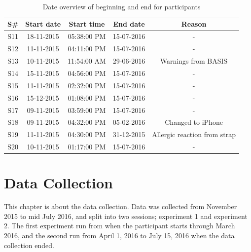 \documentclass[12pt]{article} %
\begin{document}
\begin{table}[H]
\center
\begin{footnotesize}
	\begin{tabular}{| c | c | c | c | c |}
	\hline
	\textbf{S\#} & \textbf{Start date} & \textbf{Start time} & \textbf{End date} & \textbf{Reason} \\
	
	\hline
	S11 & 18-11-2015 & 05:38:00 PM & 15-07-2016 & -\\
	S12 & 11-11-2015 & 04:11:00 PM & 15-07-2016 & -\\
	S13 & 10-11-2015 & 11:54:00 AM & 29-06-2016 & Warnings from BASIS\\
	S14 & 15-11-2015 & 04:56:00 PM & 15-07-2016 & -\\
	S15 & 11-11-2015 & 02:32:00 PM & 15-07-2016 & -\\
	S16 & 15-12-2015 & 01:08:00 PM & 15-07-2016 & -\\
	S17 & 09-11-2015 & 03:59:00 PM & 15-07-2016 & -\\
	S18 & 09-11-2015 & 04:32:00 PM & 05-02-2016 & Changed to iPhone\\
	S19 & 11-11-2015 & 04:30:00 PM & 31-12-2015 & Allergic reaction from strap\\
	S20 & 10-11-2015 & 01:17:00 PM & 15-07-2016 & -\\
	\hline
	\end{tabular}
	\caption{Date overview of beginning and end for participants}
	\label{tab:beginning}
\end{footnotesize}
\end{table}

\newpage
\section{Data Collection}
This chapter is about the data collection. Data was collected from November 2015 to mid July 2016, and split into two sessions; experiment 1 and experiment 2. The first experiment run from when the participant starts through March 2016, and the second run from April 1, 2016 to July 15, 2016 when the data collection ended. \\
\end{document}
